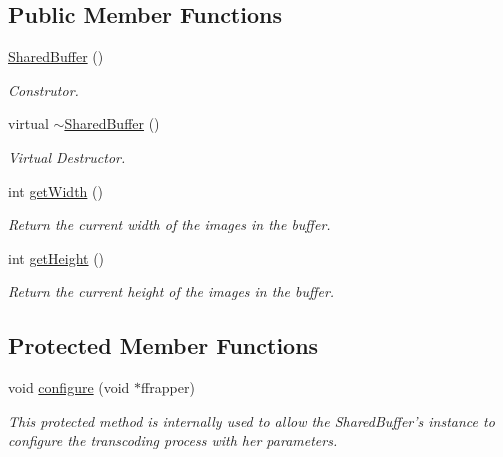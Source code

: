 \subsection*{Public Member Functions}
\begin{DoxyCompactItemize}
\item 
\hyperlink{classbr_1_1ufscar_1_1lince_1_1xpta_1_1streaming_1_1SharedBuffer_a3584d2e0791ac212f349212444c33e42}{SharedBuffer} ()
\begin{DoxyCompactList}\small\item\em Construtor. \item\end{DoxyCompactList}\item 
virtual \hyperlink{classbr_1_1ufscar_1_1lince_1_1xpta_1_1streaming_1_1SharedBuffer_ae5f5dafbf00e8d38d19b02e1815c7857}{$\sim$SharedBuffer} ()
\begin{DoxyCompactList}\small\item\em Virtual Destructor. \item\end{DoxyCompactList}\item 
int \hyperlink{classbr_1_1ufscar_1_1lince_1_1xpta_1_1streaming_1_1SharedBuffer_a9c0ce5c3d3e2f7ee24c0847d3a11bec5}{getWidth} ()
\begin{DoxyCompactList}\small\item\em Return the current width of the images in the buffer. \item\end{DoxyCompactList}\item 
int \hyperlink{classbr_1_1ufscar_1_1lince_1_1xpta_1_1streaming_1_1SharedBuffer_aaeb434b8cbbbafd18c1192bc4e885a75}{getHeight} ()
\begin{DoxyCompactList}\small\item\em Return the current height of the images in the buffer. \item\end{DoxyCompactList}\end{DoxyCompactItemize}
\subsection*{Protected Member Functions}
\begin{DoxyCompactItemize}
\item 
void \hyperlink{classbr_1_1ufscar_1_1lince_1_1xpta_1_1streaming_1_1SharedBuffer_af6606fe080919c0152ab9c844a82e40f}{configure} (void $\ast$ffrapper)
\begin{DoxyCompactList}\small\item\em This protected method is internally used to allow the SharedBuffer's instance to configure the transcoding process with her parameters. \item\end{DoxyCompactList}\end{DoxyCompactItemize}


